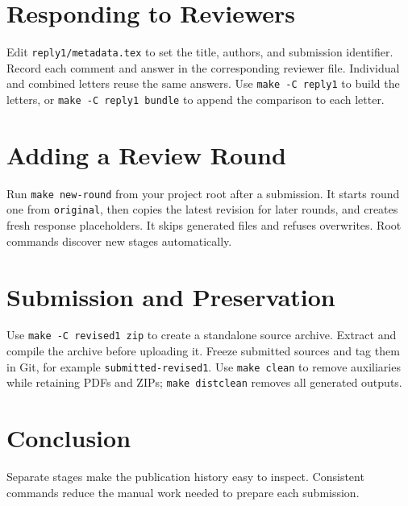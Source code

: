 \documentclass[journal]{IEEEtran}
\begin{document}
\section{Responding to Reviewers}
Edit \texttt{reply1/metadata.tex} to set the title, authors, and submission identifier.
Record each comment and answer in the corresponding reviewer file.
Individual and combined letters reuse the same answers.
Use \texttt{make -C reply1} to build the letters, or \texttt{make -C reply1 bundle}
to append the comparison to each letter.
\section{Adding a Review Round}
Run \texttt{make new-round} from your project root after a submission.
It starts round one from \texttt{original}, then copies the latest revision for later rounds,
and creates fresh response placeholders. It skips generated files and refuses overwrites.
Root commands discover new stages automatically.
\section{Submission and Preservation}
Use \texttt{make -C revised1 zip} to create a standalone source archive.
Extract and compile the archive before uploading it.
Freeze submitted sources and tag them in Git, for example \texttt{submitted-revised1}.
Use \texttt{make clean} to remove auxiliaries while retaining PDFs and ZIPs;
\texttt{make distclean} removes all generated outputs.
\section{Conclusion}
Separate stages make the publication history easy to inspect.
Consistent commands reduce the manual work needed to prepare each submission.


\end{document}
